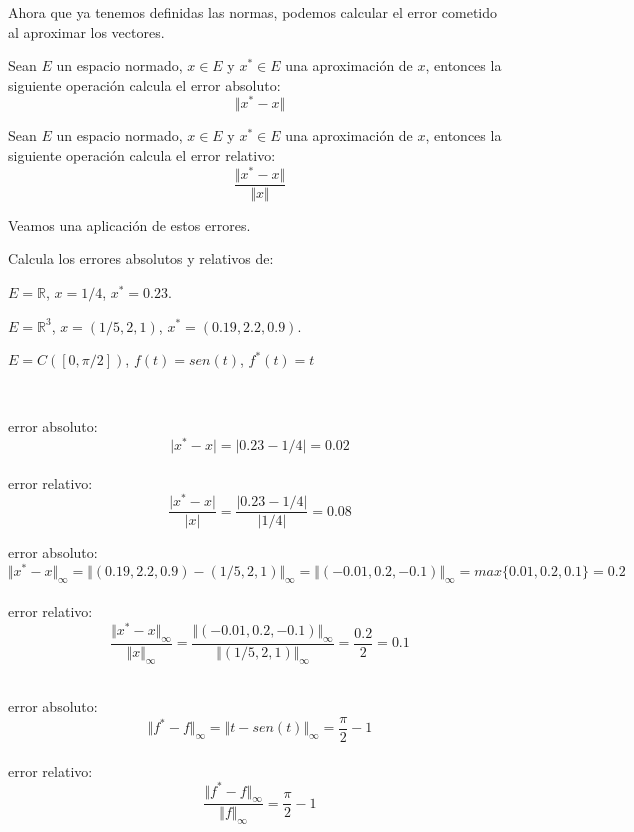 Ahora que ya tenemos definidas las normas, podemos calcular el error cometido al aproximar los vectores.

\begin{ndef}
Sean $E$ un espacio normado, $x \in E$ y $x^* \in E$ una aproximación de $x$, entonces la siguiente operación calcula el error absoluto:
\[ \Vert x^* - x \Vert \]
\end{ndef}

\begin{ndef}
Sean $E$ un espacio normado, $x \in E$ y $x^* \in E$ una aproximación de $x$, entonces la siguiente operación calcula el error relativo:
\[  \frac {\Vert x^* - x \Vert}{ \Vert x \Vert} \]
\end{ndef}

Veamos una aplicación de estos errores.

\begin{ejer}
Calcula los errores absolutos y relativos de:
	\begin{nlist}
	\item $E = \mathbb{R}$, $x = 1/4$, $x^* = 0.23$.
	\item $E = \mathbb{R}^3$, $x = (1/5,2,1)$, $x^* = (0.19,2.2,0.9)$.
	\item $E = C([0,\pi /2])$, $f(t) = sen(t)$, $f^*(t) = t$
	\end{nlist}
\end{ejer}

\begin{sol}
$ $
	\begin{nlist}
	\item error absoluto: $$\vert x^* - x \vert = \vert 0.23 - 1/4 \vert = 0.02 $$\\
	error relativo: $$\frac{\vert x^* - x \vert}{\vert x \vert} = \frac{\vert 0.23 - 1/4 \vert}{\vert 1/4 \vert} = 0.08$$
	\item error absoluto: $$\Vert x^* - x \Vert _\infty = \Vert (0.19,2.2,0.9) - (1/5,2,1) \Vert _\infty = \Vert (-0.01,0.2,-0.1) \Vert _\infty = max \lbrace 0.01,0.2,0.1\rbrace = 0.2 $$\\
	error relativo: $$\frac{\Vert x^* - x \Vert _\infty}{\Vert x \Vert _\infty} = \frac{\Vert (-0.01,0.2,-0.1) \Vert _\infty}{\Vert (1/5,2,1) \Vert _\infty} = \frac{0.2}{2} = 0.1 $$\\
	\item error absoluto: $$\Vert f^* - f \Vert _\infty = \Vert t - sen(t) \Vert _\infty = \frac{\pi}{2} - 1$$\\
	error relativo: $$\frac{\Vert f^* - f \Vert _\infty}{\Vert f \Vert _\infty} = \frac{\pi}{2} - 1 $$
	\end{nlist}
\end{sol}

